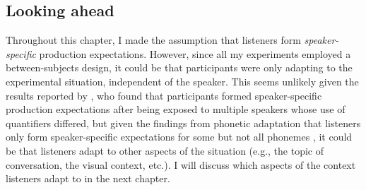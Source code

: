 \subsection{Looking ahead}



Throughout this chapter, I made the assumption that listeners  form \textit{speaker-specific} production expectations. However,
since all my experiments employed a between-subjects design, it could be that participants were only adapting to the experimental
situation, independent of the speaker. This seems unlikely given the results reported by \textcite{Yildirim2016}, who found that
participants formed speaker-specific production expectations after being exposed to multiple speakers whose use of
quantifiers differed, but given the findings from phonetic adaptation that listeners only form speaker-specific expectations
for some but not all phonemes \cite{Kraljic2006}, it could be that listeners adapt to other aspects of the situation (e.g., the topic of conversation, the visual context, etc.).
I will discuss which aspects of the context listeners adapt to in the next chapter.

